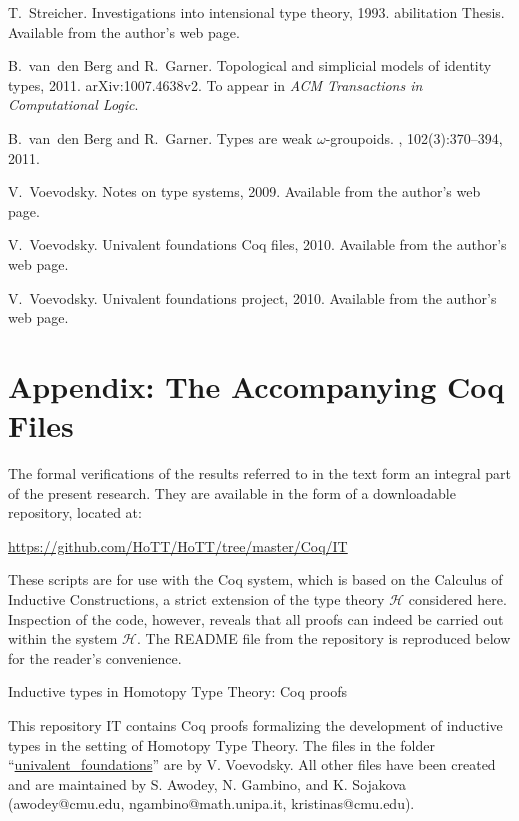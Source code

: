 \documentclass{article}
\newcommand{\Hint}{\mathcal{H}}
\theoremstyle{remark}
\theoremstyle{definition}
\begin{document}
\begin{thebibliography}{10}
T.~Streicher.
\newblock Investigations into intensional type theory, 1993.
abilitation Thesis. Available from the author's web page.

B.~van~den Berg and R.~Garner.
\newblock Topological and simplicial models of identity types, 2011.
\newblock arXiv:1007.4638v2. To appear in \emph{ACM Transactions in
  Computational Logic}.

B.~van~den Berg and R.~Garner.
\newblock Types are weak $\omega$-groupoids.
,
  102(3):370--394, 2011.

V.~Voevodsky.
\newblock Notes on type systems, 2009.
\newblock Available from the author's web page.

V.~Voevodsky.
\newblock Univalent foundations {C}oq files, 2010.
\newblock Available from the author's web page.

V.~Voevodsky.
\newblock Univalent foundations project, 2010.
\newblock Available from the author's web page.

\end{thebibliography}


\section*{Appendix: The Accompanying Coq Files}

\noindent The formal verifications of the results referred to in the text form an integral part of the present research.
They are available in the form of a downloadable repository, located at:
\begin{center}
\url{https://github.com/HoTT/HoTT/tree/master/Coq/IT}
\end{center}
These scripts are for use with the Coq system, which is based on the Calculus of Inductive Constructions, a strict extension of the type theory $\Hint$ considered here.  Inspection of the code, however, reveals that all proofs can indeed be carried out within the system $\Hint$. The README file from the repository is reproduced below for the reader's convenience.


\medskip

\noindent
Inductive types in Homotopy Type Theory: Coq proofs

\medskip

\noindent
This repository IT contains Coq proofs formalizing the development of
inductive types
in the setting of Homotopy Type Theory.
The files in the folder ``\url{univalent_foundations}''
are by V. Voevodsky.
All other files have been created and are maintained by
S. Awodey,
N. Gambino, and K. Sojakova (awodey@cmu.edu, ngambino@math.unipa.it, kristinas@cmu.edu).
\end{document}
